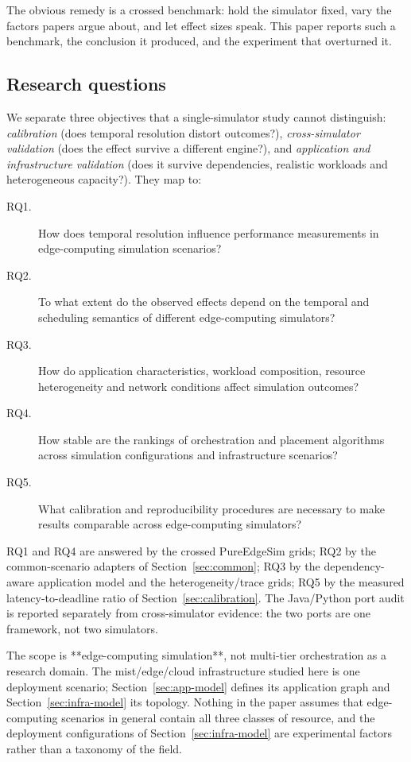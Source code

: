 \documentclass[journal,10pt]{IEEEtran}
\begin{document}
The obvious remedy is a crossed benchmark: hold the simulator fixed, vary the
factors papers argue about, and let effect sizes speak. This paper reports such
a benchmark, the conclusion it produced, and the experiment that overturned it.

\subsection{Research questions}
We separate three objectives that a single-simulator study cannot distinguish:
\emph{calibration} (does temporal resolution distort outcomes?),
\emph{cross-simulator validation} (does the effect survive a different engine?),
and \emph{application and infrastructure validation} (does it survive
dependencies, realistic workloads and heterogeneous capacity?). They map to:

\begin{description}
\item[RQ1.] How does temporal resolution influence performance measurements in
  edge-computing simulation scenarios?
\item[RQ2.] To what extent do the observed effects depend on the temporal and
  scheduling semantics of different edge-computing simulators?
\item[RQ3.] How do application characteristics, workload composition, resource
  heterogeneity and network conditions affect simulation outcomes?
\item[RQ4.] How stable are the rankings of orchestration and placement algorithms
  across simulation configurations and infrastructure scenarios?
\item[RQ5.] What calibration and reproducibility procedures are necessary to make
  results comparable across edge-computing simulators?
\end{description}

RQ1 and RQ4 are answered by the crossed PureEdgeSim grids; RQ2 by the
common-scenario adapters of Section~\ref{sec:common}; RQ3 by the dependency-aware
application model and the heterogeneity/trace grids; RQ5 by the measured
latency-to-deadline ratio of Section~\ref{sec:calibration}. The Java/Python
port audit is reported separately from cross-simulator evidence: the two ports
are one framework, not two simulators.

The scope is **edge-computing simulation**, not multi-tier orchestration as a
research domain. The mist/edge/cloud infrastructure studied here is one
deployment scenario; Section~\ref{sec:app-model} defines its application graph
and Section~\ref{sec:infra-model} its topology. Nothing in the paper assumes that
edge-computing scenarios in general contain all three classes of resource, and
the deployment configurations of Section~\ref{sec:infra-model} are experimental
factors rather than a taxonomy of the field.
\end{document}
